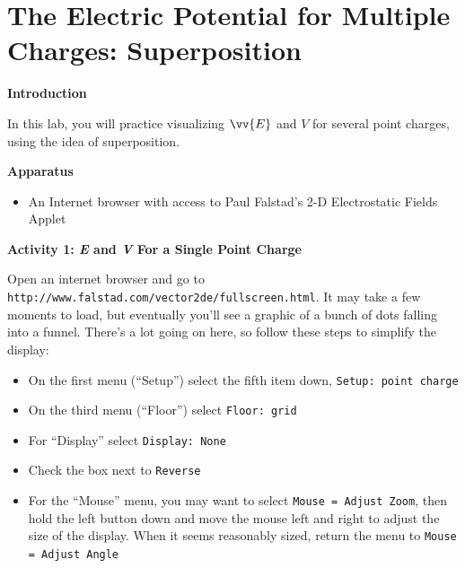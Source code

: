 \section{The Electric Potential for Multiple Charges: Superposition}
\label{potential_superposition}

\makelabheader %

\bigskip

\textbf{Introduction} 

In this lab, you will practice visualizing $\vv{E}$ and $V$ for several point charges, using the idea of superposition.

\textbf{Apparatus}

\begin{itemize}[nosep]
\item An Internet browser with access to Paul Falstad's 2-D Electrostatic Fields Applet
\end{itemize}

\bigskip

\textbf{Activity 1: \textit{E} and \textit{V} For a Single Point Charge}

Open an internet browser and go to \verb!http://www.falstad.com/vector2de/fullscreen.html!.  It may take a few moments to load, but eventually you'll see a graphic of a bunch of dots falling into a funnel.  There's a lot going on here, so follow these steps to simplify the display:
\begin{itemize}[nosep]
\item On the first menu (``Setup'') select the fifth item down, \verb!Setup: point charge!
\item On the third menu (``Floor'') select \verb!Floor: grid!
\item For ``Display'' select \verb!Display: None!
\item Check the box next to \verb!Reverse!
\item For the ``Mouse'' menu, you may want to select \verb!Mouse = Adjust Zoom!, then hold the left button down and move the mouse left and right to adjust the size of the display.  When it seems reasonably sized, return the menu to \verb!Mouse = Adjust Angle!
\end{itemize}

